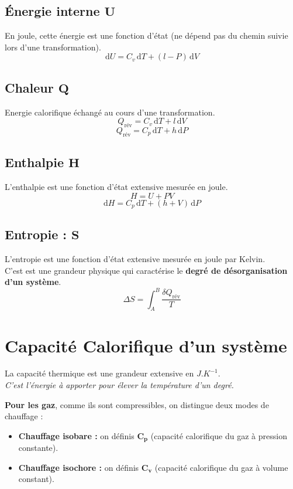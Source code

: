 \documentclass[a4paper,12pt]{article}
\newcommand{\diff}{\mathrm{d}} %
\begin{document}
\begin{multicols}{2}
    \subsection*{Énergie interne $\bm{U}$}
        En joule, cette énergie est une fonction d'état (ne dépend pas du chemin suivie lors d'une transformation).
        $$ \boxed{ \diff U = C_v \, \diff T + (l - P) \, \diff V } $$

    \subsection*{Chaleur $\bm{Q}$}
        Energie calorifique échangé au cours d'une transformation.
            $$ \boxed{ Q_{\text{rév}} = C_v \, \diff T + l \, \diff V } $$
            $$ \boxed{ Q_{\text{rév}} = C_p \, \diff T + h \, \diff P } $$


    \subsection*{Enthalpie $\bm{H}$}
        L'enthalpie est une fonction d'état extensive mesurée en joule.
            $$ \boxed{H = U + P V} $$
            $$ \boxed{ \diff H = C_p \, \diff T + (h + V) \, \diff P } $$


    \subsection*{Entropie : $\bm{S}$}
        L'entropie est une fonction d'état extensive mesurée en joule par Kelvin.\\
        C'est est une grandeur physique qui caractérise le \textbf{degré de désorganisation d'un système}.
        $$ \boxed{\Delta S = \int_{A}^{B} \dfrac{\delta Q_{\text{rév}}}{T}} $$


    \end{multicols}


\section{Capacité Calorifique d'un système}

    La capacité thermique est une grandeur extensive en $J.K^{-1}$.\\
    \textit{C'est l'énergie à apporter pour élever la température d'un degré.}
    \vspace{3mm}

    \textbf{Pour les gaz}, comme ils sont compressibles, on distingue deux modes de chauffage :
    \vspace{3pt}
    \begin{itemize}[label=\textbullet]
        \item \textbf{Chauffage isobare :} on définis $\bm{C_p}$ (capacité calorifique du gaz à pression constante).
        \item \textbf{Chauffage isochore :} on définis $\bm{C_v}$ (capacité calorifique du gaz à volume constant).
    \end{itemize}
\end{document}
